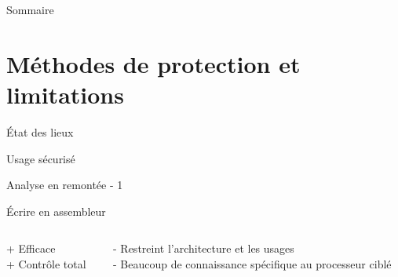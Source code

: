 \documentclass{backend/backend}
\begin{document}
{%
%
%
\begin{frame}{Sommaire}
        \small
        \tableofcontents
\end{frame}


%
%
\section{Méthodes de protection et limitations}

\begin{frame}{État des lieux}
    \begin{blockSimple}{Usage sécurisé}
        \centering
    \end{blockSimple}
\end{frame}


\begin{frame}{Analyse en remontée - 1}

    \begin{blockSimple}{Écrire en assembleur}
        \begin{columns}
            \begin{column}{0.3\textwidth}
                + Efficace\\
                + Contrôle total
            \end{column}
            \begin{column}{0.5\textwidth}
            - Restreint l'architecture et les usages\\
            - Beaucoup de connaissance spécifique au processeur ciblé
            \end{column}
        \end{columns}        
    \end{blockSimple}


\end{frame}}
\end{document}
